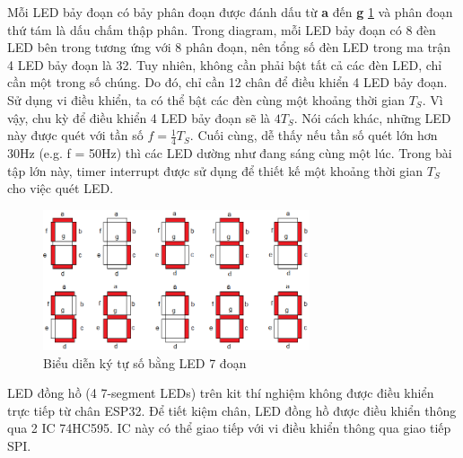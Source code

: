 Mỗi LED bảy đoạn có bảy phân đoạn được đánh dấu từ \textbf{a} đến \textbf{g} \ref{digit} và phân đoạn thứ tám là dấu chấm thập phân. Trong diagram, mỗi LED bảy đoạn có 8 đèn LED bên trong tương ứng với 8 phân đoạn, nên tổng số đèn LED trong ma trận 4 LED bảy đoạn là 32. Tuy nhiên, không cần phải bật tất cả các đèn LED, chỉ cần một trong số chúng. Do đó, chỉ cần 12 chân để điều khiển 4 LED bảy đoạn. Sử dụng vi điều khiển, ta có thể bật các đèn cùng một khoảng thời gian $T_S$. Vì vậy, chu kỳ để  điều khiển 4 LED bảy đoạn sẽ là $4T_S$. Nói cách khác, những LED này được quét với  tần số $f = \frac{1}{4} T_S$. Cuối cùng, dễ thấy nếu tần số quét lớn hơn 30Hz (e.g. f = 50Hz)  thì các LED dường như đang sáng cùng một lúc. Trong bài tập lớn này, timer interrupt được sử dụng để thiết kế một khoảng thời gian $T_S$ cho việc quét LED.
\begin{figure}[ht]
    \centering
    \includegraphics[width=0.7\textwidth]{graphics/digit_Led7.png}
    \caption{Biểu diễn ký tự số bằng LED 7 đoạn}
    \label{digit}
\end{figure}

LED đồng hồ (4 7-segment LEDs) trên kit thí nghiệm không được điều khiển trực tiếp từ chân ESP32. Để tiết kiệm chân, LED đồng hồ được điều khiển thông qua 2 IC 74HC595. IC này có thể giao tiếp với vi điều khiển thông qua giao tiếp SPI.

